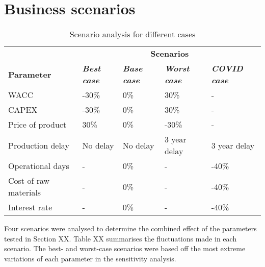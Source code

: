 
\section{Business scenarios}

\begin{table}[H]
\centering
\caption{Scenario analysis for different cases}
\label{scenario_analysis}
\begin{tabular}{l|llll}
\rowcolor[HTML]{D2F3FA} 
                      & \multicolumn{4}{c}{\cellcolor[HTML]{D2F3FA}\textbf{Scenarios}}                                                          \\
\rowcolor[HTML]{D2F3FA} 
\textbf{Parameter}    & \textit{\textbf{Best case}} & \textit{\textbf{Base case}} & \textit{\textbf{Worst case}} & \textit{\textbf{COVID case}} \\
WACC                  & -30\%                       & 0\%                         & 30\%                         & -                            \\
CAPEX                 & -30\%                       & 0\%                         & 30\%                         & -                            \\
Price of product      & 30\%                        & 0\%                         & -30\%                        & -                            \\
Production delay      & No delay                    & No delay                    & 3 year delay                 & 3 year delay                 \\
Operational days      & -                           & 0\%                         & -                            & -40\%                        \\
Cost of raw materials & -                           & 0\%                         & -                            & -40\%                        \\
Interest rate         & -                           & 0\%                         & -                            & -40\%                       
\end{tabular}
\end{table}


Four scenarios were analysed to determine the combined effect of the parameters tested in Section XX. Table XX summarises the fluctuations made in each scenario. The best- and worst-case scenarios were based off the most extreme variations of each parameter in the sensitivity analysis. 

